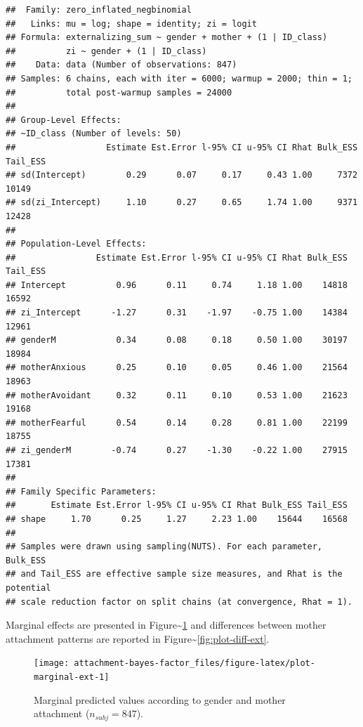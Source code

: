 \documentclass[
]{book}
\begin{document}
\begin{verbatim}
##  Family: zero_inflated_negbinomial 
##   Links: mu = log; shape = identity; zi = logit 
## Formula: externalizing_sum ~ gender + mother + (1 | ID_class) 
##          zi ~ gender + (1 | ID_class)
##    Data: data (Number of observations: 847) 
## Samples: 6 chains, each with iter = 6000; warmup = 2000; thin = 1;
##          total post-warmup samples = 24000
## 
## Group-Level Effects: 
## ~ID_class (Number of levels: 50) 
##                  Estimate Est.Error l-95% CI u-95% CI Rhat Bulk_ESS Tail_ESS
## sd(Intercept)        0.29      0.07     0.17     0.43 1.00     7372    10149
## sd(zi_Intercept)     1.10      0.27     0.65     1.74 1.00     9371    12428
## 
## Population-Level Effects: 
##                Estimate Est.Error l-95% CI u-95% CI Rhat Bulk_ESS Tail_ESS
## Intercept          0.96      0.11     0.74     1.18 1.00    14818    16592
## zi_Intercept      -1.27      0.31    -1.97    -0.75 1.00    14384    12961
## genderM            0.34      0.08     0.18     0.50 1.00    30197    18984
## motherAnxious      0.25      0.10     0.05     0.46 1.00    21564    18963
## motherAvoidant     0.32      0.11     0.10     0.53 1.00    21623    19168
## motherFearful      0.54      0.14     0.28     0.81 1.00    22199    18755
## zi_genderM        -0.74      0.27    -1.30    -0.22 1.00    27915    17381
## 
## Family Specific Parameters: 
##       Estimate Est.Error l-95% CI u-95% CI Rhat Bulk_ESS Tail_ESS
## shape     1.70      0.25     1.27     2.23 1.00    15644    16568
## 
## Samples were drawn using sampling(NUTS). For each parameter, Bulk_ESS
## and Tail_ESS are effective sample size measures, and Rhat is the potential
## scale reduction factor on split chains (at convergence, Rhat = 1).
\end{verbatim}

Marginal effects are presented in Figure\textasciitilde\ref{fig:plot-marginal-ext} and differences between mother attachment patterns are reported in Figure\textasciitilde\ref{fig:plot-diff-ext}.

\begin{figure}

{\centering \texttt{[image: attachment-bayes-factor\_files/figure-latex/plot-marginal-ext-1]} 

}

\caption{Marginal predicted values according to gender and mother attachment ($n_{subj} = 847$).}\label{fig:plot-marginal-ext}
\end{figure}
\end{document}
